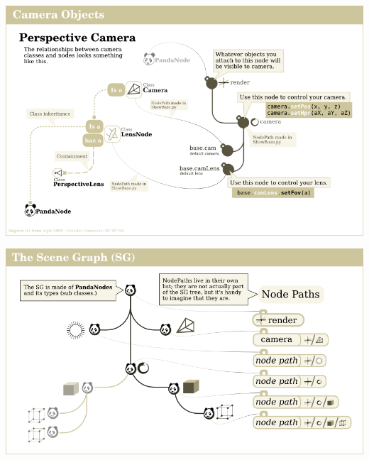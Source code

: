 \documentclass[a4paper,10pt]{book}
\begin{document}
\begin{center}
\includegraphics[scale=0.8]{PerspectiveCamera.png} 
\end{center}

\begin{center}
\includegraphics[scale=0.8]{SceneGraph.png} 
\end{center}
\end{document}
